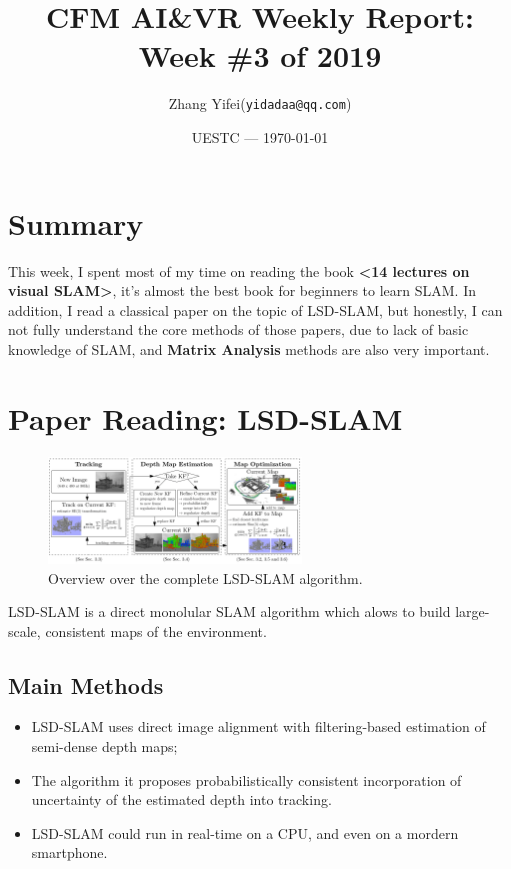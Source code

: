 \documentclass{article}
\title{CFM AI\&VR Weekly Report: Week \#3 of 2019}
\author{Zhang Yifei(\texttt{yidadaa@qq.com})}
\date{UESTC --- \today}
\begin{document}
    
    \maketitle

    \section{Summary}
    This week, I spent most of my time on reading the book \textbf{<14 lectures on visual SLAM>}, it's almost the best book for beginners to learn SLAM. In addition, I read a classical paper on the topic of LSD-SLAM, but honestly, I can not fully understand the core methods of those papers, due to lack of basic knowledge of SLAM, and \textbf{Matrix Analysis} methods are also very important.

    \section{Paper Reading: LSD-SLAM}
    \begin{figure}[h]
        \centering
        \includegraphics[width=0.6\textwidth,natwidth=1110,natheight=469]{./img/LSD-SLAM.png}
        \caption{Overview over the complete LSD-SLAM algorithm.}
    \end{figure}

    LSD-SLAM is a direct monolular SLAM algorithm which alows to build large-scale, consistent maps of the environment.
    \subsection{Main Methods}
    \begin{itemize}
        \item LSD-SLAM uses direct image alignment with filtering-based estimation of semi-dense depth maps;
        \item The algorithm it proposes probabilistically consistent incorporation of uncertainty of the estimated depth into tracking.
        \item LSD-SLAM could run in real-time on a CPU, and even on a mordern smartphone. 
    \end{itemize}
\end{document}
